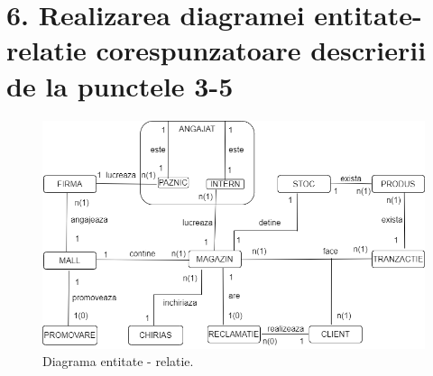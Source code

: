 
\section*{6. Realizarea diagramei entitate-relatie corespunzatoare descrierii de la punctele 3-5}
\vspace{1cm}
\begin{figure}[h]
  \centerline{\includegraphics[scale=0.75]{images/ERDSCHEMA.png}}
  \caption{ Diagrama entitate - relatie.}
\end{figure}

